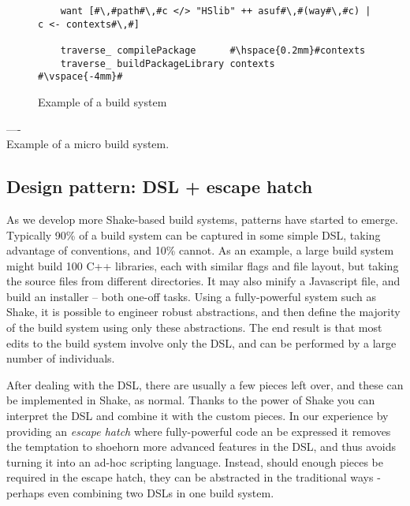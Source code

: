 \begin{figure}
\begin{lstlisting}
    want [#\,#path#\,#c </> "HSlib" ++ asuf#\,#(way#\,#c) | c <- contexts#\,#]

    traverse_ compilePackage      #\hspace{0.2mm}#contexts
    traverse_ buildPackageLibrary contexts
#\vspace{-4mm}#
\end{lstlisting}
\caption{Example of a build system\label{fig:example-abstractions}}
\end{figure}

\noindent ----\\
\noindent Example of a micro build system.

\subsection{Design pattern: DSL + escape hatch}

As we develop more Shake-based build systems, patterns have started to emerge. Typically 90\% of a build system can be captured in some simple DSL, taking advantage of conventions, and 10\% cannot. As an example, a large build system might build 100 C++ libraries, each with similar flags and file layout, but taking the source files from different directories. It may also minify a Javascript file, and build an installer -- both one-off tasks. Using a fully-powerful system such as Shake, it is possible to engineer robust abstractions, and then define the majority of the build system using only these abstractions. The end result is that most edits to the build system involve only the DSL, and can be performed by a large number of individuals.

After dealing with the DSL, there are usually a few pieces left over, and these can be implemented in Shake, as normal. Thanks to the power of Shake you can interpret the DSL and combine it with the custom pieces. In our experience by providing an \textit{escape hatch} where fully-powerful code an be expressed it removes the temptation to shoehorn more advanced features in the DSL, and thus avoids turning it into an ad-hoc scripting language. Instead, should enough pieces be required in the escape hatch, they can be abstracted in the traditional ways - perhaps even combining two DSLs in one build system.

